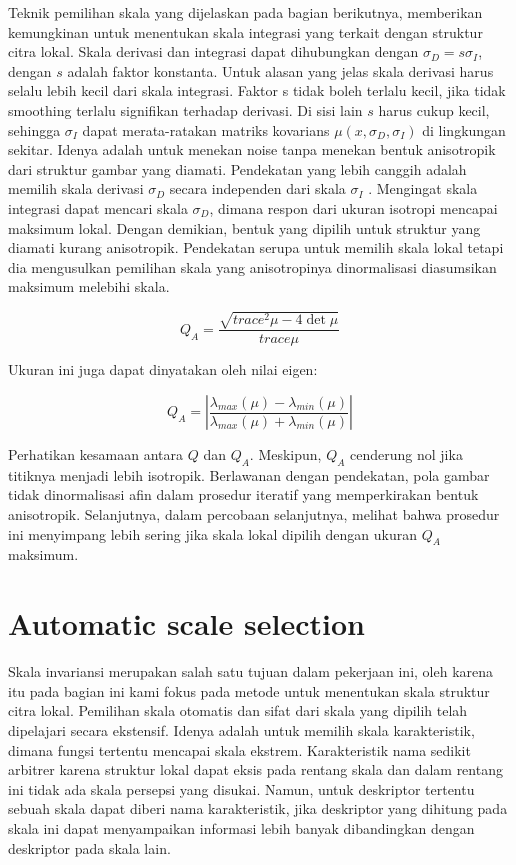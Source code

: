 Teknik pemilihan skala yang dijelaskan pada bagian berikutnya, memberikan kemungkinan untuk menentukan skala integrasi yang 
terkait dengan struktur citra lokal. Skala derivasi dan integrasi dapat dihubungkan dengan \(\sigma_{D}=s \sigma_{I}\), dengan \(s\) adalah 
faktor konstanta. Untuk alasan yang jelas skala derivasi harus selalu lebih kecil dari skala integrasi. Faktor s tidak boleh 
terlalu kecil, jika tidak smoothing terlalu signifikan terhadap derivasi. Di sisi lain \(s\) harus cukup kecil, sehingga \(\sigma_{I}\) dapat 
merata-ratakan matriks kovarians \(\mu(x,\sigma_{D},\sigma_{I})\) di lingkungan sekitar. Idenya adalah untuk menekan noise tanpa menekan bentuk 
anisotropik dari struktur gambar yang diamati. Pendekatan yang lebih canggih adalah memilih skala derivasi \(\sigma_{D}\) secara independen 
dari skala \(\sigma_{I}\) . Mengingat skala integrasi  dapat mencari skala \(\sigma_{D}\), dimana respon dari ukuran isotropi mencapai maksimum lokal. 
Dengan demikian, bentuk yang dipilih untuk struktur yang diamati kurang anisotropik. Pendekatan serupa untuk memilih skala lokal tetapi dia mengusulkan pemilihan skala yang anisotropinya dinormalisasi diasumsikan 
maksimum melebihi skala.

\begin{equation}
  Q_{A} = \frac{\sqrt{trace^{2}\mu - 4\det\mu}}{trace\mu}
\end{equation}

Ukuran ini juga dapat dinyatakan oleh nilai eigen:

\begin{equation*}
  Q_{A} = \left\lvert \frac{\lambda_{max}(\mu) - \lambda_{min}(\mu)}{\lambda_{max}(\mu) + \lambda_{min}(\mu)}\right\rvert 
\end{equation*}

Perhatikan kesamaan antara \(Q\) dan \(Q_{A}\). Meskipun, \(Q_{A}\) cenderung nol jika titiknya menjadi lebih isotropik. 
Berlawanan dengan pendekatan, pola gambar tidak dinormalisasi afin dalam prosedur iteratif yang memperkirakan bentuk anisotropik. 
Selanjutnya, dalam percobaan selanjutnya, melihat bahwa prosedur ini menyimpang lebih sering jika skala lokal dipilih dengan ukuran \(Q_{A}\) maksimum.

\section{Automatic scale selection}
Skala invariansi merupakan salah satu tujuan dalam pekerjaan ini, oleh karena itu pada bagian ini kami fokus 
pada metode untuk menentukan skala struktur citra lokal. Pemilihan skala otomatis dan sifat dari skala yang 
dipilih telah dipelajari secara ekstensif. Idenya adalah untuk memilih skala karakteristik, 
dimana fungsi tertentu mencapai skala ekstrem. Karakteristik nama sedikit arbitrer karena struktur lokal 
dapat eksis pada rentang skala dan dalam rentang ini tidak ada skala persepsi yang disukai. 
Namun, untuk deskriptor tertentu sebuah skala dapat diberi nama karakteristik, jika deskriptor yang 
dihitung pada skala ini dapat menyampaikan informasi lebih banyak dibandingkan dengan deskriptor pada skala lain.

